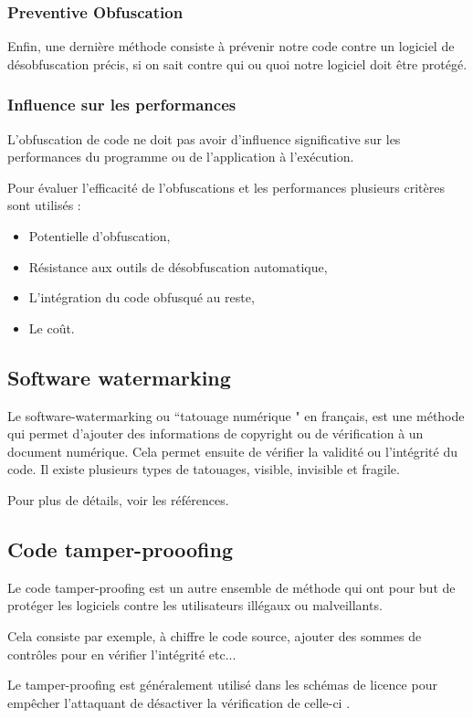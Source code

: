 \documentclass{article}
\begin{document}
\subsubsection{Preventive Obfuscation}
Enfin, une dernière méthode consiste à prévenir notre code contre un logiciel de désobfuscation précis, si on sait contre qui ou quoi notre logiciel doit être protégé.

\subsubsection{Influence sur les performances}
L'obfuscation de code ne doit pas avoir d'influence significative sur les performances du programme ou de l'application à l'exécution.

Pour évaluer l'efficacité de l'obfuscations et les performances plusieurs critères sont utilisés :
\begin{itemize}
    \item Potentielle d'obfuscation,
    \item Résistance aux outils de désobfuscation automatique,
    \item L'intégration du code obfusqué au reste,
    \item Le coût.
\end{itemize}

\subsection{Software watermarking}
Le software-watermarking \cite{james} ou ``tatouage numérique \cite{wiki}" en français, est une méthode qui permet d'ajouter des informations de copyright ou de vérification à un document numérique. Cela permet ensuite de vérifier la validité ou l'intégrité du code. Il existe plusieurs types de tatouages, visible, invisible et fragile.

Pour plus de détails, voir les références.

\subsection{Code tamper-prooofing}
Le code tamper-proofing \cite{wiki2} est un autre ensemble de méthode qui ont pour but de protéger les logiciels contre les utilisateurs illégaux ou malveillants.

Cela consiste par exemple, à chiffre le code source, ajouter des sommes de contrôles pour en vérifier l'intégrité etc...

Le tamper-proofing est généralement utilisé dans les schémas de licence pour empêcher l'attaquant de désactiver la vérification de celle-ci \cite{tamper}.
\end{document}
